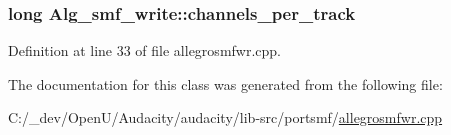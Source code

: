 \subsubsection[{\texorpdfstring{channels\+\_\+per\+\_\+track}{channels_per_track}}]{\setlength{\rightskip}{0pt plus 5cm}long Alg\+\_\+smf\+\_\+write\+::channels\+\_\+per\+\_\+track}\hypertarget{class_alg__smf__write_acb8efc800bf89ce26c7bdf71eaf304fe}{}\label{class_alg__smf__write_acb8efc800bf89ce26c7bdf71eaf304fe}


Definition at line 33 of file allegrosmfwr.\+cpp.



The documentation for this class was generated from the following file\+:\begin{DoxyCompactItemize}
\item 
C\+:/\+\_\+dev/\+Open\+U/\+Audacity/audacity/lib-\/src/portsmf/\hyperlink{allegrosmfwr_8cpp}{allegrosmfwr.\+cpp}\end{DoxyCompactItemize}
